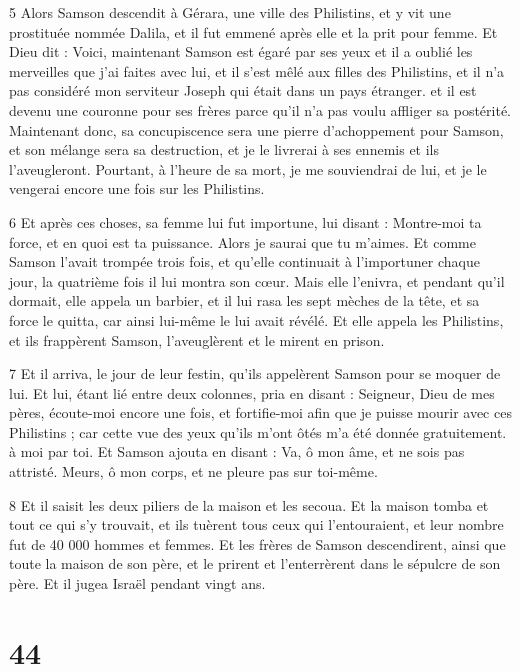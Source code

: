 \par 5 Alors Samson descendit à Gérara, une ville des Philistins, et y vit une prostituée nommée Dalila, et il fut emmené après elle et la prit pour femme. Et Dieu dit : Voici, maintenant Samson est égaré par ses yeux et il a oublié les merveilles que j'ai faites avec lui, et il s'est mêlé aux filles des Philistins, et il n'a pas considéré mon serviteur Joseph qui était dans un pays étranger. et il est devenu une couronne pour ses frères parce qu'il n'a pas voulu affliger sa postérité. Maintenant donc, sa concupiscence sera une pierre d'achoppement pour Samson, et son mélange sera sa destruction, et je le livrerai à ses ennemis et ils l'aveugleront. Pourtant, à l'heure de sa mort, je me souviendrai de lui, et je le vengerai encore une fois sur les Philistins.

\par 6 Et après ces choses, sa femme lui fut importune, lui disant : Montre-moi ta force, et en quoi est ta puissance. Alors je saurai que tu m'aimes. Et comme Samson l'avait trompée trois fois, et qu'elle continuait à l'importuner chaque jour, la quatrième fois il lui montra son cœur. Mais elle l'enivra, et pendant qu'il dormait, elle appela un barbier, et il lui rasa les sept mèches de la tête, et sa force le quitta, car ainsi lui-même le lui avait révélé. Et elle appela les Philistins, et ils frappèrent Samson, l'aveuglèrent et le mirent en prison.

\par 7 Et il arriva, le jour de leur festin, qu'ils appelèrent Samson pour se moquer de lui. Et lui, étant lié entre deux colonnes, pria en disant : Seigneur, Dieu de mes pères, écoute-moi encore une fois, et fortifie-moi afin que je puisse mourir avec ces Philistins ; car cette vue des yeux qu'ils m'ont ôtés m'a été donnée gratuitement. à moi par toi. Et Samson ajouta en disant : Va, ô mon âme, et ne sois pas attristé. Meurs, ô mon corps, et ne pleure pas sur toi-même.

\par 8 Et il saisit les deux piliers de la maison et les secoua. Et la maison tomba et tout ce qui s'y trouvait, et ils tuèrent tous ceux qui l'entouraient, et leur nombre fut de 40 000 hommes et femmes. Et les frères de Samson descendirent, ainsi que toute la maison de son père, et le prirent et l'enterrèrent dans le sépulcre de son père. Et il jugea Israël pendant vingt ans.

\chapter{44}


